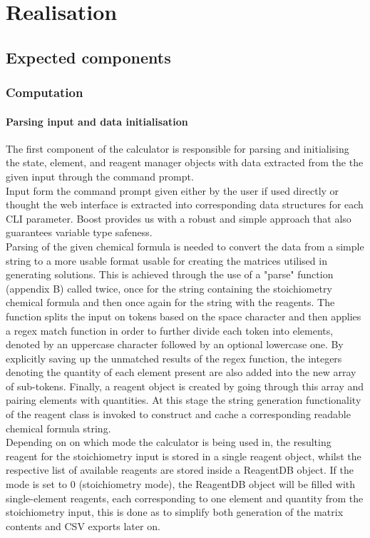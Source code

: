 \chapter{Realisation}
\label{ch:realisation}
\section{Expected components}
\subsection{Computation}
\subsubsection{Parsing input and data initialisation}
The first component of the calculator is responsible for parsing and initialising the state, element, and reagent manager objects with data extracted from the the given input through the command prompt. \\

Input form the command prompt given either by the user if used directly or thought the web interface is extracted into corresponding data structures for each CLI parameter. Boost \cite{karlsson2005} provides us with a robust and simple approach that also guarantees variable type safeness. \\

Parsing of the given chemical formula is needed to convert the data from a simple string to a more usable format usable for creating the matrices utilised in generating solutions. This is achieved through the use of a "parse" function (appendix B) called twice, once for the string containing the stoichiometry chemical formula and then once again for the string with the reagents. The function splits the input on tokens based on the space character and then applies a regex match function in order to further divide each token into elements, denoted by an uppercase character followed by an optional lowercase one. By explicitly saving up the unmatched results of the regex function, the integers denoting the quantity of each element present are also added into the new array of sub-tokens. Finally, a reagent object is created by going through this array and pairing elements with quantities. At this stage the string generation functionality of the reagent class is invoked to construct and cache a corresponding readable chemical formula string.\\

Depending on on which mode the calculator is being used in, the resulting reagent for the stoichiometry input is stored in a single reagent object, whilst the respective list of available reagents are stored inside a ReagentDB object. If the mode is set to 0 (stoichiometry mode), the ReagentDB object will be filled with single-element reagents, each corresponding to one element and quantity from the stoichiometry input, this is done as to simplify both generation of the matrix contents and CSV exports later on. \\

